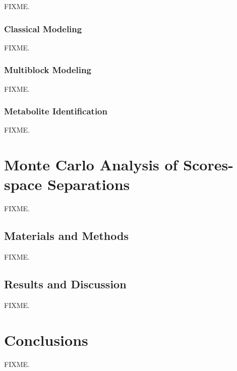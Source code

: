 \begin{doublespace}
FIXME.
\end{doublespace}

\subsubsection{Classical Modeling}

\begin{doublespace}
FIXME.
\end{doublespace}

\subsubsection{Multiblock Modeling}

\begin{doublespace}
FIXME.
\end{doublespace}

\subsubsection{Metabolite Identification}

\begin{doublespace}
FIXME.
\end{doublespace}

\section{Monte Carlo Analysis of Scores-space Separations}

\begin{doublespace}
FIXME.
\end{doublespace}

\subsection{Materials and Methods}

\begin{doublespace}
FIXME.
\end{doublespace}

\subsection{Results and Discussion}

\begin{doublespace}
FIXME.
\end{doublespace}

\section{Conclusions}

\begin{doublespace}
FIXME.
\end{doublespace}




